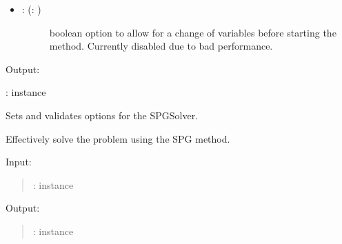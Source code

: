 \documentclass[a4paper,10pt,english]{sphinxmanual}
\begin{document}
\begin{fulllineitems}
\begin{description}
\begin{itemize}
\item {} \begin{description}
\item[{: (: )}] \leavevmode
boolean option to allow for a change of variables before starting the 
method. Currently disabled due to bad performance.

\end{description}

\end{itemize}

\end{description}

Output:

:  instance

\begin{fulllineitems}
\label{\detokenize{skprocrustes:skprocrustes.SPGSolver._setoptions}}
Sets and validates options for the SPGSolver.


\end{fulllineitems}


\begin{fulllineitems}
\label{\detokenize{skprocrustes:skprocrustes.SPGSolver.solve}}
Effectively solve the problem using the SPG method.

Input:
\begin{quote}

:  instance
\end{quote}

Output:
\begin{quote}

:  instance
\end{quote}

\end{fulllineitems}


\end{fulllineitems}

\end{document}
